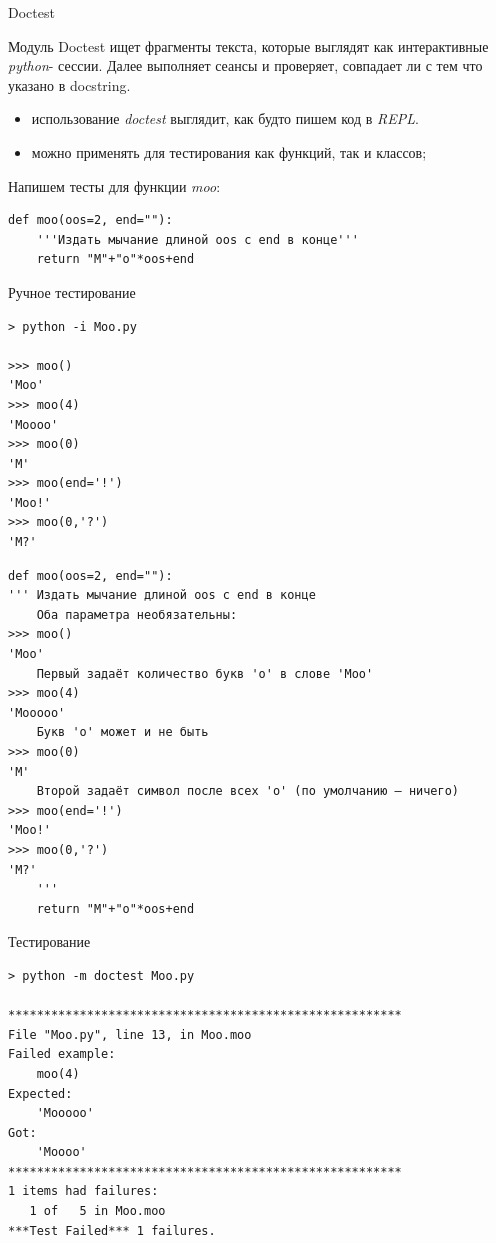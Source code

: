 \documentclass[xcolor=table]{beamer}
\begin{document}
\begin{frame}[t, fragile]{Doctest}
	\linespread{1.0}
	\begin{block}{Модуль Doctest}
		ищет фрагменты текста, которые выглядят как интерактивные \textit{python}- сессии. Далее выполняет сеансы и проверяет, совпадает ли с тем что указано в docstring.
	\end{block}
	\begin{itemize}
		\item использование \textit{doctest} выглядит, как будто пишем код в \textit{REPL}.
		\item можно применять для тестирования как функций, так и классов;
	\end{itemize}
	
	\medskip
	
	Напишем тесты для функции \textit{moo}:
	\begin{verbatim}
def moo(oos=2, end=""):
    '''Издать мычание длиной oos с end в конце'''
    return "M"+"o"*oos+end	
	\end{verbatim}
\end{frame}

\begin{frame}[t, fragile]{Ручное тестирование}	
	\begin{verbatim}
> python -i Moo.py

>>> moo()
'Moo'
>>> moo(4)
'Moooo'
>>> moo(0)
'M'
>>> moo(end='!')
'Moo!'
>>> moo(0,'?')
'M?'
	\end{verbatim}
\end{frame}

\begin{frame}[t, fragile]
	\begin{verbatim}
def moo(oos=2, end=""):
''' Издать мычание длиной oos с end в конце
    Оба параметра необязательны:
>>> moo()
'Moo'
    Первый задаёт количество букв 'o' в слове 'Moo'
>>> moo(4)
'Mooooo'
    Букв 'o' может и не быть
>>> moo(0)
'M'
    Второй задаёт символ после всех 'o' (по умолчанию — ничего)
>>> moo(end='!')
'Moo!'
>>> moo(0,'?')
'M?'
    '''
    return "M"+"o"*oos+end
	\end{verbatim}
\end{frame}

\begin{frame}[t, fragile]{Тестирование}
	\begin{verbatim}
> python -m doctest Moo.py

*******************************************************
File "Moo.py", line 13, in Moo.moo
Failed example:
    moo(4)
Expected:
    'Mooooo'
Got:
    'Moooo'
*******************************************************
1 items had failures:
   1 of   5 in Moo.moo
***Test Failed*** 1 failures.
	\end{verbatim}
\end{frame}
\end{document}
